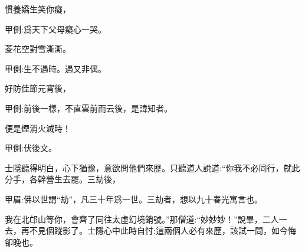 \begin{poem}
    \begin{pl}慣養嬌生笑你癡，\end{pl}\begin{note}甲側:爲天下父母癡心一哭。\end{note}

    \begin{pl}菱花空對雪澌澌。\end{pl}\begin{note}甲側:生不遇時。遇又非偶。\end{note}

    \begin{pl}好防佳節元宵後，\end{pl}\begin{note}甲側:前後一樣，不直雲前而云後，是諱知者。\end{note}

    \begin{pl}便是煙消火滅時！\end{pl}\begin{note}甲側:伏後文。\end{note}
\end{poem}


\begin{parag}
    士隱聽得明白，心下猶豫，意欲問他們來歷。只聽道人說道:“你我不必同行，就此分手，各幹營生去罷。三劫後，\begin{note}甲眉:佛以世謂“劫”，凡三十年爲一世。三劫者，想以九十春光寓言也。\end{note}我在北邙山等你，會齊了同往太虛幻境銷號。”那僧道:“妙妙妙！”說畢，二人一去，再不見個蹤影了。士隱心中此時自忖:這兩個人必有來歷，該試一問，如今悔卻晚也。
\end{parag}


